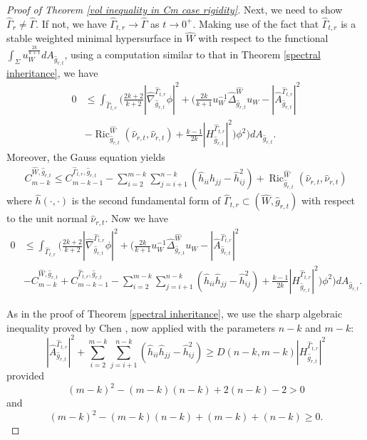 \documentclass[11pt]{amsart}
\DeclareMathOperator{\Ric}{Ric}
\theoremstyle{definition}
\theoremstyle{remark}
\numberwithin{equation}{section}
\begin{document}
\begin{proof}[Proof of Theorem \ref{vol inequality in Cm case rigidity}]
        Next, we need to show $\hat{\Gamma}_{r}\neq \hat{\Gamma}$. If not, we have
          $\hat{\Gamma}_{t,r}\rightarrow\hat{\Gamma}$ as $t\rightarrow 0^+$. 
        Making use of the fact that $\hat{\Gamma}_{t,r}$ is a stable weighted minimal
          hypersurface in $\hat{W}$ with respect to the functional
          $\int_{\Sigma}u_{W}^{\frac{2k}{k+1}}d A_{\hat{g}_{r,t}}$, using a computation similar
          to that in Theorem \ref{spectral inheritance}, we have
    \begin{equation}
    \begin{split}
    0&\leq  \int_{\hat{\Gamma}_{t,r}}\bigg(
      \frac{2k+2}{k+2}|\hat\nabla^{\hat{\Gamma}_{t,r}}_{\hat{g}_{r,t}}\phi|^2+\big(\frac{2k}{k+1}u_{W}^{-1}\hat{\Delta}^{\hat{W}}_{\hat{g}_{r,t}} u_{W}-|\hat{A}^{\hat{\Gamma}_{t,r}}_{\hat{g}_{r,t}}|^2\\
    & -\Ric^{\hat{W}}_{\hat{g}_{r,t}}(\hat{\nu}_{r,t},\hat{\nu}_{r,t})+\frac{k-1}{2k}|H^{\hat{\Gamma}_{t,r}}_{\hat{g}_{r,t}}|^2\big)\phi^2 \bigg) dA_{\hat{g}_{r,t}}.
    \end{split}
    \end{equation}
    Moreover, the Gauss equation yields
\begin{align*}
    C_{m-k}^{\hat{W},\hat{g}_{r,t}}\leq
      C_{m-k-1}^{\hat{\Gamma}_{t,r},\hat{g}_{r,t}}-\sum_{i=2}^{m-k}\sum_{j=i+1}^{n-k}
      (\hat{h}_{ii}\hat{h}_{jj}-\hat{h}_{ij}^2)+\Ric^{\hat{W}}_{\hat{g}_{r,t}}(\hat{\nu}_{r,t},\hat{\nu}_{r,t})
\end{align*}    
where $\hat h(\cdot,\cdot)$ is the second fundamental form of
  $\hat{\Gamma}_{t,r}\subset(\hat{W},\hat g_{r,t})$ with respect to the unit normal
  $\hat\nu_{r,t}$. Now we have
    \begin{equation}
    \begin{split}
    0&\leq  \int_{\hat{\Gamma}_{t,r}}\bigg(
      \frac{2k+2}{k+2}|\hat\nabla^{\hat{\Gamma}_{t,r}}_{\hat{g}_{r,t}}\phi|^2+\big(\frac{2k}{k+1}u_{W}^{-1}\hat{\Delta}^{\hat{W}}_{\hat{g}_{r,t}} u_{W}-|\hat{A}^{\hat{\Gamma}_{t,r}}_{\hat{g}_{r,t}}|^2\\
    &-C_{m-k}^{\hat{W},\hat{g}_{r,t}}+C_{m-k-1}^{\hat{\Gamma}_{t,r},\hat{g}_{r,t}}-\sum_{i=2}^{m-k}\sum_{j=i+1}^{n-k} (\hat{h}_{ii}\hat{h}_{jj}-\hat{h}_{ij}^2)+\frac{k-1}{2k}|H^{\hat{\Gamma}_{t,r}}_{\hat{g}_{r,t}}|^2\big)\phi^2 \bigg) dA_{\hat{g}_{r,t}}.
    \end{split}
    \end{equation}


As in the proof of Theorem \ref{spectral inheritance}, we use the sharp algebraic inequality
  proved by Chen \cite[Lemma 5.8]{chenshuli_end}, now applied with the parameters $n-k$ and
  $m-k$:
\[|\hat{A}^{\hat{\Gamma}_{t,r}}_{\hat{g}_{r,t}}|^2+\sum_{i=2}^{m-k}\sum_{j=i+1}^{n-k}
  (\hat{h}_{ii}\hat{h}_{jj}-\hat{h}_{ij}^2)\geq
  D(n-k,m-k)|H^{\hat{\Gamma}_{t,r}}_{\hat{g}_{r,t}}|^{2}\]
provided
\[
    (m-k)^2-(m-k)(n-k)+2(n-k)-2>0
\]
and
\[
    (m-k)^2-(m-k)(n-k)+(m-k)+(n-k)\geq 0.
\]



\end{proof}
\end{document}
